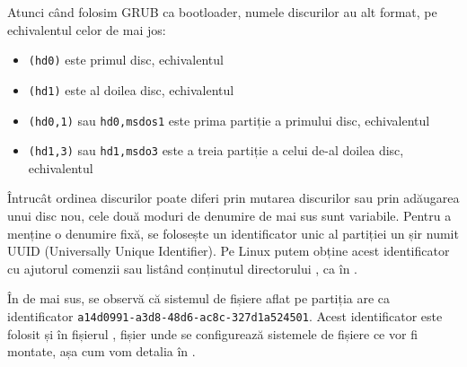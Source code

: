 Atunci când folosim GRUB ca bootloader, numele discurilor au alt format,
pe echivalentul celor de mai jos:

\begin{itemize}
  \item \texttt{(hd0)} este primul disc, echivalentul 
  \item \texttt{(hd1)} este al doilea disc, echivalentul 
  \item \texttt{(hd0,1)} sau \texttt{hd0,msdos1} este prima partiție a primului disc,
    echivalentul 
  \item \texttt{(hd1,3)} sau \texttt{hd1,msdo3} este a treia partiție a celui de-al doilea
    disc, echivalentul 
\end{itemize}

Întrucât ordinea discurilor poate diferi prin mutarea discurilor sau prin
adăugarea unui disc nou, cele două moduri de denumire de mai sus sunt variabile.
Pentru a menține o denumire fixă, se folosește un identificator unic al
partiției un șir numit UUID 
(Universally Unique Identifier). Pe Linux putem obține acest identificator cu
ajutorul comenzii  sau listând conținutul directorului ,
ca în .


În  de mai sus, se observă că sistemul de fișiere aflat pe partiția  are ca
identificator \texttt{a14d0991-a3d8-48d6-ac8c-327d1a524501}. Acest identificator
este folosit și în fișierul , fișier unde se configurează
sistemele de fișiere ce vor fi montate, așa cum vom detalia în
.

